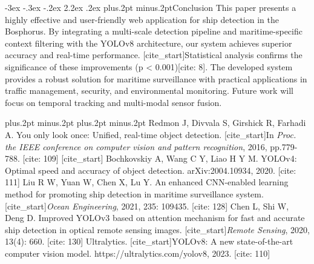 \documentclass[twoside]{article}
\makeatletter
\def\section{\@startsection{section}{1}{\z@}%
 {-3ex \@plus -.3ex \@minus -.2ex}%
 {2.2ex \@plus.2ex}%
{\normalfont\normalsize\protect\baselineskip=14.5pt plus.2pt minus.2pt\bfseries}}
\makeatother
\begin{document}
\begin{multicols}{2}
\section{Conclusion}
This paper presents a highly effective and user-friendly web application for ship detection in the Bosphorus. By integrating a multi-scale detection pipeline and maritime-specific context filtering with the YOLOv8 architecture, our system achieves superior accuracy and real-time performance. [cite_start]Statistical analysis confirms the significance of these improvements (p < 0.001)[cite: 8]. The developed system provides a robust solution for maritime surveillance with practical applications in traffic management, security, and environmental monitoring. Future work will focus on temporal tracking and multi-modal sensor fusion.

\begin{thebibliography}{99}
\footnotesize
\itemsep=-3pt plus.2pt minus.2pt
\baselineskip=13pt plus.2pt minus.2pt
 Redmon J, Divvala S, Girshick R, Farhadi A. You only look once: Unified, real-time object detection. [cite_start]In {\it Proc. the IEEE conference on computer vision and pattern recognition}, 2016, pp.779-788. [cite: 109]
[cite_start] Bochkovskiy A, Wang C Y, Liao H Y M. YOLOv4: Optimal speed and accuracy of object detection. arXiv:2004.10934, 2020. [cite: 111]
 Liu R W, Yuan W, Chen X, Lu Y. An enhanced CNN-enabled learning method for promoting ship detection in maritime surveillance system. [cite_start]{\it Ocean Engineering}, 2021, 235: 109435. [cite: 128]
 Chen L, Shi W, Deng D. Improved YOLOv3 based on attention mechanism for fast and accurate ship detection in optical remote sensing images. [cite_start]{\it Remote Sensing}, 2020, 13(4): 660. [cite: 130]
 Ultralytics. [cite_start]YOLOv8: A new state-of-the-art computer vision model. https://ultralytics.com/yolov8, 2023. [cite: 110]
\end{thebibliography}

\end{multicols}
\end{document}
